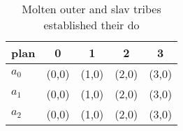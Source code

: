 \documentclass[a4paper]{article}
\begin{document}
\begin{table}
\begin{adjustbox}{width=0.6\columnwidth}
\begin{tabular}{|l|l|l|l|l|}
\hline
\textbf{plan} & \multicolumn{1}{c|}{\textbf{0}} & \multicolumn{1}{c|}{\textbf{1}} & \multicolumn{1}{c|}{\textbf{2}} & \multicolumn{1}{c|}{\textbf{3}} \\ \hline
\textbf{$a_0$}  & (0,0) & (1,0) & (2,0) & (3,0) \\ \hline
\textbf{$a_1$}  & (0,0) & (1,0) & (2,0) & (3,0) \\ \hline
\textbf{$a_2$}  & (0,0) & (1,0) & (2,0) & (3,0) \\ \hline
\end{tabular}
\end{adjustbox}
\caption{Molten outer and slav tribes established their do
}
\end{table}
\end{document}
